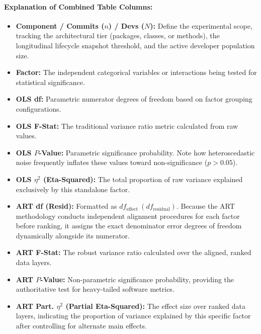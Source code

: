 \paragraph{Explanation of Combined Table Columns:}
\begin{itemize}
    \item \textbf{Component / Commits ($n$) / Devs ($N$):} Define the experimental scope, tracking the architectural tier (packages, classes, or methods), the longitudinal lifecycle snapshot threshold, and the active developer population size.
    \item \textbf{Factor:} The independent categorical variables or interactions being tested for statistical significance.
    
    \item \textbf{OLS df:} Parametric numerator degrees of freedom based on factor grouping configurations.
    \item \textbf{OLS F-Stat:} The traditional variance ratio metric calculated from raw values.
    \item \textbf{OLS $P$-Value:} Parametric significance probability. Note how heteroscedastic noise frequently inflates these values toward non-significance ($p > 0.05$).
    \item \textbf{OLS $\eta^2$ (Eta-Squared):} The total proportion of raw variance explained exclusively by this standalone factor.
    
    \item \textbf{ART df (Resid):} Formatted as $df_{\mathrm{effect}}~(df_{\mathrm{residual}})$. Because the ART methodology conducts independent alignment procedures for each factor before ranking, it assigns the exact denominator error degrees of freedom dynamically alongside its numerator.
    \item \textbf{ART F-Stat:} The robust variance ratio calculated over the aligned, ranked data layers.
    \item \textbf{ART $P$-Value:} Non-parametric significance probability, providing the authoritative test for heavy-tailed software metrics.
    \item \textbf{ART Part. $\eta^2$ (Partial Eta-Squared):} The effect size over ranked data layers, indicating the proportion of variance explained by this specific factor after controlling for alternate main effects.
\end{itemize}

